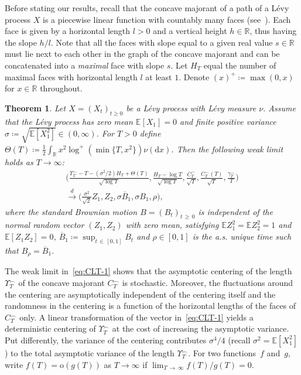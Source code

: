 \documentclass[10pt]{amsart}
\newtheorem{theo}{Theorem}[section]
\theoremstyle{definition}\newtheorem{defi}[theo]{Definition}\newtheorem{rema}[theo]{Remark}\newtheorem{exam}[theo]{Example}\newtheorem{exem}[theo]{Example}\newtheorem{nota}[theo]{Notation}
\newcommand\R{\mathbb{R}}
\newcommand\E{\mathds{E}}
\newcommand\1{\mathds{1}}
\newcommand\D{\mathrm{d}}
\newcommand\oh{\mathrm{o}}
\newcommand\cid{\xrightarrow{d}}
\newcommand\ov[1]{\overline{#1}}
\begin{document}
Before stating our results, recall that the concave majorant of a path of a Lévy process $X$ is a piecewise linear function with countably many faces (see~\cite[Theorem~11]{CM_Fluctuation_Levy}). Each face is given by a horizontal length $l>0$ and a vertical height $h\in\R$, thus having the slope $h/l$. Note that all the faces with slope equal to a given real value $s\in\R$ must lie next to each other in the graph of the concave majorant and can be concatenated into a \emph{maximal} face with slope $s$. Let $H_T$ equal the number of maximal faces with horizontal length $l$ at least $1$. Denote $(x)^+\coloneqq\max(0,x)$ for $x\in\R$ throughout.


\begin{theo}\label{thm:maintheorem1}
Let $X=(X_t)_{t\ge 0}$ be a Lévy process with Lévy measure $\nu$. Assume that the Lévy process has zero mean $\E [X_1]=0$ and finite positive variance $\sigma\coloneqq\sqrt{\E[X_1^2]}\in(0,\infty)$. For $T>0$ define $\Theta(T)\coloneqq \frac{1}{2}
\int_\R x^2\log^+(\min\{T,x^2\})\nu(\D x)$. Then the following weak limit holds as $T\to\infty$:
\begin{equation}\label{eq:CLT-1}
\begin{multlined}
\bigg(
\frac{\Upsilon_T^{\frown} -T-\left(\sigma^2/2\right)H_T +\Theta(T)}{\sqrt{\log T}},
\frac{H_T-\log T}{\sqrt{\log T}},
\frac{\ov{C}^\frown_T}{\sqrt{T}},
\frac{C^\frown_T(T)}{\sqrt{T}},
\frac{\gamma^\frown_T}{T}
\bigg)\\
\cid
\Big(
\tfrac{\sigma^2}{\sqrt{2}}Z_1, Z_2,
\sigma\ov B_1,
\sigma B_1,
\rho
\Big),
\end{multlined}
\end{equation}
where the standard Brownian motion $B=(B_t)_{t\,\geq\,0}$ is independent of the normal random vector $(Z_1,Z_2)$ with zero mean, satisfying $\E Z_1^2=\E Z_2^2=1$ and $\E [Z_1Z_2]=0$, $\ov B_1\coloneqq\sup_{t\,\in\,[0,1]}B_t$ and $\rho\in[0,1]$ is the a.s. unique time such that $B_\rho=\ov B_1$.
\end{theo}

The weak limit in~\eqref{eq:CLT-1} shows that the asymptotic centering of the length $\Upsilon_T^\frown$ of the concave majorant $C^\frown_T$ is stochastic. Moreover, the fluctuations around the centering are asymptotically independent of the centering itself and the randomness in the centering is a function of the horizontal lengths of the faces of $C^\frown_T$ only. A linear transformation of the vector in~\eqref{eq:CLT-1} yields a deterministic centering of $\Upsilon_T^\frown$ at the cost of increasing the asymptotic variance. Put differently, the variance of the centering contributes $\sigma^4/4$ (recall $\sigma^2=\E [X_1^2]$) to the total asymptotic variance of the length $\Upsilon_T^\frown$. For two functions~$f$ and~$g$, write $f(T)=\oh(g(T))$ as $T\to\infty$ if $\lim_{T\,\to\,\infty}f(T)/g(T)=0$.
\end{document}

